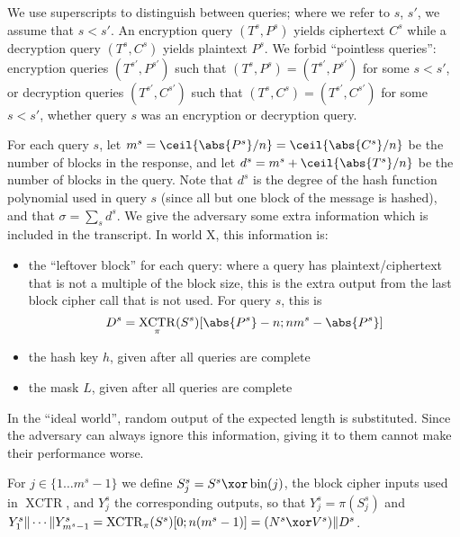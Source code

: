 \documentclass[letterpaper,11pt]{article}
\newcommand*{\Concat}{\Vert}
\DeclareMathOperator{\fromint}{bin}
\DeclareMathOperator{\XCTR}{XCTR}
\begin{document}
We use superscripts to distinguish between queries;
where we refer to \(s\), \(s'\), we assume that \(s < s'\).
An encryption query \((T^s, P^s)\) yields ciphertext \(C^s\)
while a decryption query \((T^s, C^s)\)
yields plaintext \(P^s\).
We forbid ``pointless queries'':
encryption queries \((T^{s'}, P^{s'})\)
such that \((T^s, P^s) = (T^{s'}, P^{s'})\) for some \(s < s'\), 
or decryption queries \((T^{s'}, C^{s'})\)
such that \((T^s, C^s) = (T^{s'}, C^{s'})\) for some \(s < s'\),
whether query \(s\) was an encryption or decryption query.

For each query \(s\), 
let \(m^s = \ceil{\abs{P^s}/n} = \ceil{\abs{C^s}/n}\)
be the number of blocks in the response,
and let \(d^s = m^s + \ceil{\abs{T^s}/n}\)
be the number of blocks in the query.
Note that \(d^s\) is the degree of the hash
function polynomial used in query \(s\)
(since all but one block of the message is hashed),
and that \(\sigma = \sum_s d^s\).
We give the adversary some extra information
which is included in the transcript.
In world X, this information is:
\begin{itemize}
    \item the ``leftover block'' for each query:
    where a query has plaintext/ciphertext
    that is not a multiple of the block size,
    this is the extra output from the last
    block cipher call that is not used.
    For query \(s\), this is 
    \begin{displaymath}
        D^s = \XCTR_\pi(S^s)[\abs{P^s} - n; nm^s-\abs{P^s}]
    \end{displaymath}
    \item the hash key \(h\), given after all queries are complete
    \item the mask \(L\), given after all queries are complete
\end{itemize}
In the ``ideal world'', random output of the expected
length is substituted. Since the adversary can always ignore
this information, giving it to them cannot make their performance worse.

For \(j \in \{1 \ldots m^s-1\}\) we define \(S_j^s = S^s \xor \fromint(j)\),
the block cipher inputs used in \(\XCTR\), and \(Y_j^s\) the corresponding
outputs, so that \(Y_j^s = \pi(S_j^s)\) and 
\(Y_1^s \Concat \cdots \Concat Y_{m^s-1}^s = \XCTR_\pi(S^s)[0;n(m^s -1)] 
= (N^s \xor V^s) \Concat D^s\).
\end{document}
